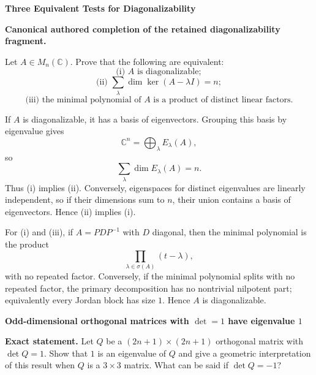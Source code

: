 \begin{problem}[CP-I-0045]
\label{prob:cp-i-0045}
\textbf{Three Equivalent Tests for Diagonalizability}

\textbf{Canonical authored completion of the retained diagonalizability fragment.}

\hspace*{1.5em}Let \(A\in M_n(\mathbb C)\). Prove that the following are equivalent:
\[
\text{(i) }A\text{ is diagonalizable};
\]
\[
\text{(ii) }\sum_{\lambda}\dim\ker(A-\lambda I)=n;
\]
\[
\text{(iii) the minimal polynomial of }A\text{ is a product of distinct linear factors}.
\]
\end{problem}

\begin{solution}
If \(A\) is diagonalizable, it has a basis of eigenvectors. Grouping this basis by eigenvalue gives
\[
\mathbb C^n=\bigoplus_\lambda E_\lambda(A),
\]
so
\[
\sum_\lambda\dim E_\lambda(A)=n.
\]
Thus (i) implies (ii). Conversely, eigenspaces for distinct eigenvalues are linearly independent,
so if their dimensions sum to \(n\), their union contains a basis of eigenvectors. Hence (ii)
implies (i).

For (i) and (iii), if \(A=PDP^{-1}\) with \(D\) diagonal, then the minimal polynomial is the
product
\[
\prod_{\lambda\in\sigma(A)}(t-\lambda),
\]
with no repeated factor. Conversely, if the minimal polynomial splits with no repeated factor,
the primary decomposition has no nontrivial nilpotent part; equivalently every Jordan block has
size \(1\). Hence \(A\) is diagonalizable.
\end{solution}

\begin{problem}[CP-I-0046]
\label{prob:cp-i-0046}
\textbf{Odd-dimensional orthogonal matrices with \(\det=1\) have eigenvalue \(1\)}

\textbf{Exact statement.}
\hspace*{1.5em}Let \(Q\) be a \((2n+1)\times(2n+1)\) orthogonal matrix with \(\det Q=1\).
Show that \(1\) is an eigenvalue of \(Q\) and give a geometric interpretation of this result when \(Q\) is a \(3\times3\) matrix.
What can be said if \(\det Q=-1\)?

\end{problem}

